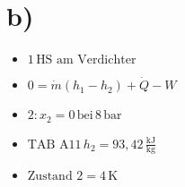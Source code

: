 

\section*{b)}

\begin{itemize}
    \item \( 1 \, \text{HS am Verdichter} \)
    \item \( 0 = \dot{m} (h_1 - h_2) + \dot{Q} - W \)
    \item \( 2: x_2 = 0 \, \text{bei} \, 8 \, \text{bar} \)
    \item \( \text{TAB A11} \, h_2 = 93,42 \, \frac{\text{kJ}}{\text{kg}} \)
    \item \( \text{Zustand 2} = 4 \, \text{K} \)
\end{itemize}
